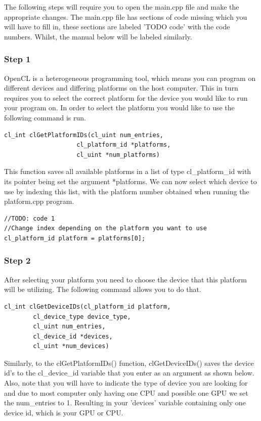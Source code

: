 The following steps will require you to open the main.cpp file and make the appropriate changes. The main.cpp file has sections of code missing which you will have to fill in, these sections are labeled 'TODO code' with the code numbers. Whilst, the manual below will be labeled similarly.
\subsubsection{Step 1}
OpenCL is a heterogeneous programming tool, which means you can program on different devices and differing platforms on the host computer. This in turn requires you to select the correct platform for the device you would like to run your program on. In order to select the platform you would like to use the following command is run. 
\begin{lstlisting}
cl_int clGetPlatformIDs(cl_uint num_entries,
					cl_platform_id *platforms, 
					cl_uint *num_platforms)
\end{lstlisting}

This function saves all available platforms in a list of type cl\_platform\_id with its pointer being set the argument *platforms. We can now select which device to use by indexing this list, with the platform number obtained when running the platform.cpp program. 

\begin{lstlisting}
//TODO: code 1
//Change index depending on the platform you want to use
cl_platform_id platform = platforms[0]; 
\end{lstlisting}

\subsubsection{Step 2}
After selecting your platform you need to choose the device that this platform will be utilizing. The following command allows you to do that.

\begin{lstlisting}
cl_int clGetDeviceIDs(cl_platform_id platform,
		cl_device_type device_type, 
		cl_uint num_entries, 
		cl_device_id *devices, 
		cl_uint *num_devices)
\end{lstlisting}
Similarly, to the clGetPlatformIDs() function, clGetDeviceIDs() saves the device id's to the cl\_device\_id variable that you enter as an argument as shown below. Also, note that you will have to indicate the type of device you are looking for and due to most computer only having one CPU and possible one GPU we set the num\_entries to 1. Resulting in your 'devices' variable containing only one device id, which is your GPU or CPU.

